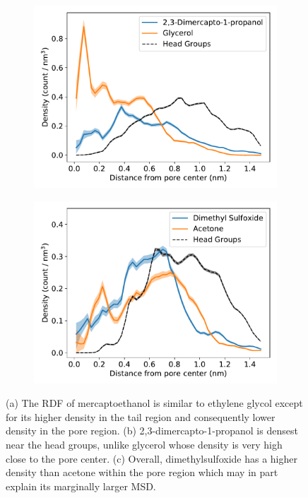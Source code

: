 \documentclass{article}
\begin{document}
\begin{figure}
\begin{subfigure}{0.45\linewidth}
  \includegraphics[width=\textwidth]{thiol_comparison_DMP.pdf}
  \caption{}\label{fig:DMP_GLY_comparison}
  \end{subfigure}
  \begin{subfigure}{0.45\linewidth}
  \includegraphics[width=\textwidth]{thiol_comparison_DMS.pdf}
  \caption{}\label{fig:DMP_GLY_comparison}
  \end{subfigure}
  \caption{(a) The RDF of mercaptoethanol is similar to ethylene glycol except 
  for its higher density in the tail region and consequently lower density in the
  pore region. (b) 2,3-dimercapto-1-propanol is densest near the head groups, 
  unlike glycerol whose density is very high close to the pore center. 
  (c) Overall, dimethylsulfoxide has a higher density than acetone within the 
  pore region which may in part explain its marginally larger MSD.}\label{fig:sulfur_analog_rdfs}
  \end{figure}
  
\end{document}
